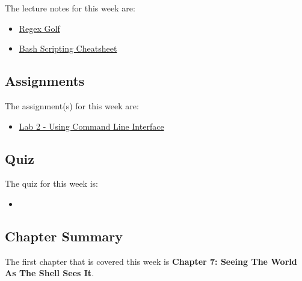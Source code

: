 \noindent The lecture notes for this week are:

\begin{itemize}
    \item \href{https://alf.nu/RegexGolf?world=regex&level=r00}{Regex Golf}
    \item \href{https://devhints.io/bash}{Bash Scripting Cheatsheet}
\end{itemize}

\subsection{Assignments}

The assignment(s) for this week are:

\begin{itemize}
    \item \href{https://github.com/QuantumCompiler/CU/tree/main/CSPB%203308%20-%20Software%20Development%20Methods%20And%20Tools/Assignments/Assignment%202%20-%20Linux%20Command%20Line}{Lab 2 - Using Command Line Interface}
\end{itemize}

\subsection{Quiz}

The quiz for this week is:

\begin{itemize}
    \item {}
\end{itemize}

\newpage

\subsection{Chapter Summary}

The first chapter that is covered this week is \textbf{Chapter 7: Seeing The World As The Shell Sees It}.


